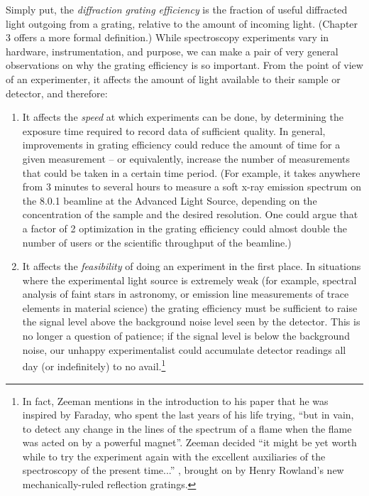 Simply put, the \emph{diffraction grating efficiency} is the fraction of useful diffracted light outgoing from a grating, relative to the amount of incoming light.  (Chapter 3 offers a more formal definition.)  While spectroscopy experiments vary in hardware, instrumentation, and purpose, we can make a pair of very general observations on why the grating efficiency is so important.  From the point of view of an experimenter, it affects the amount of light available to their sample or detector, and therefore:
\begin{enumerate}
\item It affects the \emph{speed} at which experiments can be done, by determining the exposure time required to record data of sufficient quality.  In general, improvements in grating efficiency could reduce the amount of time for a given measurement -- or equivalently, increase the number of measurements that could be taken in a certain time period.  (For example, it takes anywhere from 3 minutes to several hours to measure a soft x-ray emission spectrum on the 8.0.1 beamline at the Advanced Light Source, depending on the concentration of the sample and the desired resolution.  One could argue that a factor of 2 optimization in the grating efficiency could almost double the number of users or the scientific throughput of the beamline.)
\item It affects the \emph{feasibility} of doing an experiment in the first place.  In situations where the experimental light source is extremely weak (for example, spectral analysis of faint stars in astronomy, or emission line measurements of trace elements in material science) the grating efficiency must be sufficient to raise the signal level above the background noise level seen by the detector.  This is no longer a question of patience; if the signal level is below the background noise, our unhappy experimentalist could accumulate detector readings all day (or indefinitely) to no avail.\footnote{In fact, Zeeman mentions in the introduction to his paper that he was inspired by Faraday, who spent the last years of his life trying, ``but in vain, to detect any change in the lines of the spectrum of a flame when the flame was acted on by a powerful magnet''.  Zeeman decided ``it might be yet worth while to try the experiment again with the excellent auxiliaries of the spectroscopy of the present time...'' \cite{Zee97}, brought on by Henry Rowland's new mechanically-ruled reflection gratings.}
\end{enumerate}

